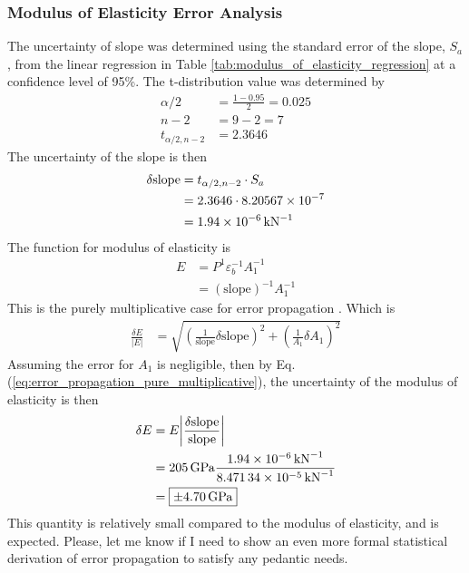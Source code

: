 \subsubsection{Modulus of Elasticity Error Analysis}
The uncertainty of slope was determined using the standard error of the slope, $S_a$, from the linear regression in Table \ref{tab:modulus_of_elasticity_regression} at a confidence level of 95\%. The t-distribution value was determined by 
\begin{align*}
    \alpha/2 &= \frac{1 - 0.95}{2} = 0.025 \\
    n - 2 &= 9 - 2 = 7 \\
    t_{\alpha/2, n-2} &= 2.3646
\end{align*}
The uncertainty of the slope is then \cite{wheeler_ganji}
\begin{align*}
    \delta \text{slope} &= t_{\alpha/2, n-2} \cdot S_a \\
    &= 2.3646 \cdot 8.20567 \times 10^{-7} \\
    &= \qty{1.94E-06}{\per\kilo\newton}
\end{align*}
The function for modulus of elasticity is 
\begin{align*}
    E &= P^{1} \varepsilon_b^{-1} A_1^{-1} \\
    &= (\text{slope})^{-1} A_1^{-1}
\end{align*}
This is the purely multiplicative case for error propagation \cite{wheeler_ganji}.  Which is
\begin{align*}
    \frac{\delta E}{|E|} &= \sqrt{\left(\frac{1}{\text{slope}} \delta \text{slope}\right)^2 + \left(\frac{1}{A_1} \delta A_1\right)^2}
\end{align*}
Assuming the error for $A_1$ is negligible, then by Eq. (\ref{eq:error_propagation_pure_multiplicative}), the uncertainty of the modulus of elasticity is then
\begin{align*}
    \delta E &= E \bigg|\frac{\delta \text{slope}}{\text{slope}}\bigg|\\
    &= \qty{205}{\giga\pascal} \frac{\qty{1.94E-06}{\per\kilo\newton}}{\qty{8.47134E-05}{\per\kilo\newton}} \\
    &= \boxed{\pm \qty{4.70}{\giga\pascal}}
\end{align*}
This quantity is relatively small compared to the modulus of elasticity, and is expected. Please, let me know if I need to show an even more formal statistical derivation of error propagation to satisfy any pedantic needs.

